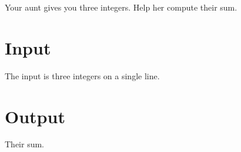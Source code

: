 

Your aunt gives you three integers.
Help her compute their sum.

\section*{Input}

The input is three integers on a single line.

\section*{Output}

Their sum.
